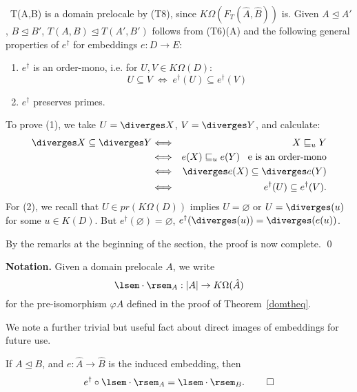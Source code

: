 \proof\ T(A,B) is a domain prelocale by (T8), 
since $K\Omega (F_{T}(\hat{A},\hat{B}))$ is. 
Given $A \trianglelefteq A'$, $B \trianglelefteq B'$, 
$T(A,B) \trianglelefteq T(A',B')$ follows from (T6)(A) and the following 
general properties of $e^{\dag}$ for embeddings $e : D \rightarrow E$:
\begin{enumerate}
\item $e^{\dag}$ is an order-mono, i.e. for $U, V \in K\Omega (D)$:
\[ U \subseteq V \; \Longleftrightarrow \; e^{\dag}(U) \subseteq e^{\dag}(V) \]
\item $e^{\dag}$ preserves primes.
\end{enumerate}
To prove (1), we take $U = \diverges  X$, $V = \diverges  Y$, and calculate:
\begin{eqnarray*}
\diverges  X \subseteq \diverges  Y & \Longleftrightarrow & X \sqsubseteq_{u} Y \\
& \Longleftrightarrow & e(X) \sqsubseteq_{u} e(Y) \;\;\; \mbox{{\mit e} 
is an order-mono} \\
& \Longleftrightarrow & \diverges  e(X) \subseteq \diverges  e(Y) \\
& \Longleftrightarrow & e^{\dag}(U) \subseteq e^{\dag}(V).
\end{eqnarray*}
For (2), we recall that $U \in pr(K\Omega (D))$ implies $U = \varnothing$ or $U = \diverges (u)$ for some $u \in K(D)$. But $e^{\dag}(\varnothing) = \varnothing$, $e^{\dag}(\diverges (u)) = \diverges (e(u))$.

By the remarks at the beginning of the section, the proof is now complete. \qed

{\bf Notation.} Given a domain prelocale $A$, we write
\[ \lsem \cdot \rsem_{A} : |A| \rightarrow K\Omega (\hat{A}) \]
for the pre-isomorphism $\varphi A$ defined in the proof of Theorem~\ref{domtheq}.

We note a further trivial but useful fact about direct images of embeddings for future use.
\begin{proposition}
\label{embim}
If $A \trianglelefteq B$, and $e : \hat{A} \rightarrow \hat{B}$ is the induced embedding, then
\[ e^{\dag} \circ \lsem \cdot \rsem_{A} = \lsem \cdot \rsem_{B}. \; \qed \]
\end{proposition}

